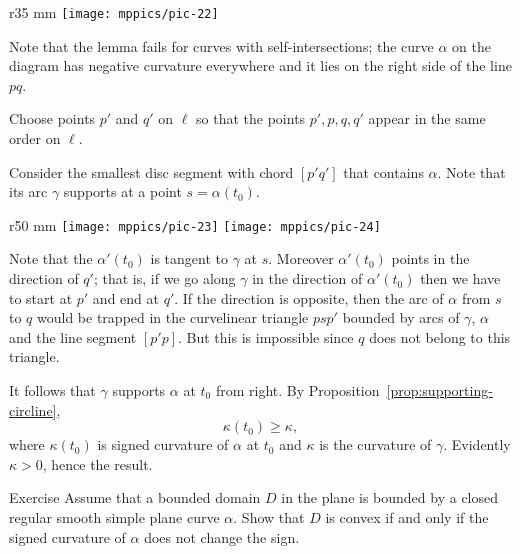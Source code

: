 \begin{wrapfigure}{r}{35 mm}
\vskip-4mm
\centering
\texttt{[image: mppics/pic-22]}
\vskip0mm
\end{wrapfigure}

Note that the lemma fails for curves with self-intersections;
the curve $\alpha$ on the diagram has negative curvature everywhere and it lies on the right side of the line $pq$. 

Choose points $p'$ and $q'$ on $\ell$
so that the points $p', p, q, q'$ appear in the same order on $\ell$.

Consider the smallest disc segment with chord $[p'q']$ that contains $\alpha$.
Note that its arc $\gamma$ supports at a point $s=\alpha(t_0)$.

\begin{wrapfigure}{r}{50 mm}
\centering
\texttt{[image: mppics/pic-23]}
\bigskip
\texttt{[image: mppics/pic-24]}
\vskip0mm
\end{wrapfigure}
Note that the $\alpha'(t_0)$ is tangent to $\gamma$ at $s$.
Moreover $\alpha'(t_0)$ points in the direction of $q'$;
that is, if we go along $\gamma$ in the direction  of $\alpha'(t_0)$ then we have to start at $p'$ and end at $q'$.
If the direction is opposite, then the arc of $\alpha$ from $s$ to $q$ would be trapped in the curvelinear triangle $psp'$ bounded by arcs of $\gamma$, $\alpha$ and the line segment $[p'p]$.
But this is impossible since $q$ does not belong to this triangle.

It follows that $\gamma$ supports $\alpha$ at $t_0$ from right.
By Proposition~\ref{prop:supporting-circline}, 
\[\kappa(t_0)\ge \kappa,\]
where $\kappa(t_0)$ is signed curvature of $\alpha$ at $t_0$ and $\kappa$ is the curvature of $\gamma$.
Evidently $\kappa>0$, hence the result.
\qeds

\begin{thm}{Exercise}
Assume that a bounded domain $D$ in the plane is bounded by a closed regular smooth simple plane curve $\alpha$.
Show that $D$ is convex if and only if the signed curvature of $\alpha$ does not change the sign.
\end{thm}









